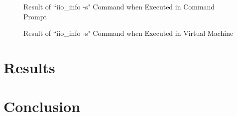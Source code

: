\documentclass{article}
\begin{document}
\begin{figure}[H]
	\centerline{}
	\caption{Result of ``iio\_info -s" Command when Executed in Command Prompt}
	\label{fig::iio_info_cmd}
\end{figure}

\begin{figure}[H]
	\centerline{}
	\caption{Result of ``iio\_info -s" Command when Executed in Virtual Machine}
	\label{fig::iio_info_vm}
\end{figure}

\section{Results}

\section{Conclusion}

\nocite{analog_devices_libiio_error}

{}
%
	
\end{document}
